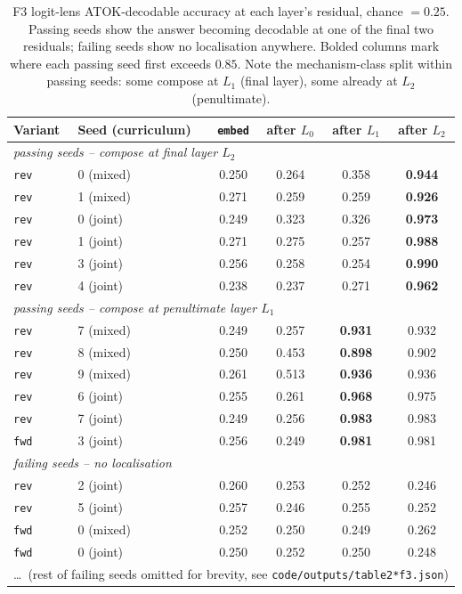 \documentclass[11pt]{article}
\newcommand{\us}{\textunderscore}
\begin{document}
\begin{table}[h]
\centering
\caption{F3 logit-lens ATOK-decodable accuracy at each layer's residual,
chance $= 0.25$. Passing seeds show the answer becoming decodable at
one of the final two residuals; failing seeds show no localisation
anywhere. Bolded columns mark where each passing seed first exceeds
$0.85$. Note the mechanism-class split within passing seeds:
some compose at $L_1$ (final layer), some already at $L_2$
(penultimate).}
\label{tab:f3}
\begin{tabular}{llcccc}
\toprule
Variant & Seed (curriculum) & \texttt{embed} & after $L_0$ & after $L_1$ & after $L_2$ \\
\midrule
\multicolumn{6}{l}{\emph{passing seeds -- compose at final layer $L_2$}} \\
\texttt{rev} & 0 (mixed) & 0.250 & 0.264 & 0.358 & \textbf{0.944} \\
\texttt{rev} & 1 (mixed) & 0.271 & 0.259 & 0.259 & \textbf{0.926} \\
\texttt{rev} & 0 (joint) & 0.249 & 0.323 & 0.326 & \textbf{0.973} \\
\texttt{rev} & 1 (joint) & 0.271 & 0.275 & 0.257 & \textbf{0.988} \\
\texttt{rev} & 3 (joint) & 0.256 & 0.258 & 0.254 & \textbf{0.990} \\
\texttt{rev} & 4 (joint) & 0.238 & 0.237 & 0.271 & \textbf{0.962} \\
\midrule
\multicolumn{6}{l}{\emph{passing seeds -- compose at penultimate layer $L_1$}} \\
\texttt{rev} & 7 (mixed) & 0.249 & 0.257 & \textbf{0.931} & 0.932 \\
\texttt{rev} & 8 (mixed) & 0.250 & 0.453 & \textbf{0.898} & 0.902 \\
\texttt{rev} & 9 (mixed) & 0.261 & 0.513 & \textbf{0.936} & 0.936 \\
\texttt{rev} & 6 (joint) & 0.255 & 0.261 & \textbf{0.968} & 0.975 \\
\texttt{rev} & 7 (joint) & 0.249 & 0.256 & \textbf{0.983} & 0.983 \\
\texttt{fwd} & 3 (joint) & 0.256 & 0.249 & \textbf{0.981} & 0.981 \\
\midrule
\multicolumn{6}{l}{\emph{failing seeds -- no localisation}} \\
\texttt{rev} & 2 (joint) & 0.260 & 0.253 & 0.252 & 0.246 \\
\texttt{rev} & 5 (joint) & 0.257 & 0.246 & 0.255 & 0.252 \\
\texttt{fwd} & 0 (mixed) & 0.252 & 0.250 & 0.249 & 0.262 \\
\texttt{fwd} & 0 (joint) & 0.250 & 0.252 & 0.250 & 0.248 \\
\multicolumn{6}{c}{\ldots\ (rest of failing seeds omitted for brevity, see \texttt{code/outputs/table2\us{}\us{}*f3.json})} \\
\bottomrule
\end{tabular}
\end{table}
\end{document}
